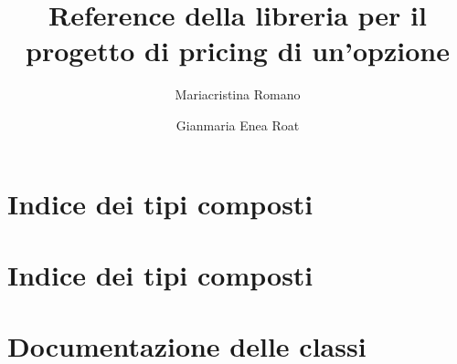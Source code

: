 \documentclass[a4paper]{book}
\title{Reference della libreria per il progetto di pricing di un'opzione}
\author{Mariacristina Romano\and Gianmaria Enea Roat}
\begin{document}
\maketitle

{}
\tableofcontents
{}
\chapter{Indice dei tipi composti}

\chapter{Indice dei tipi composti}

\chapter{Documentazione delle classi}
































\printindex
\end{document}
